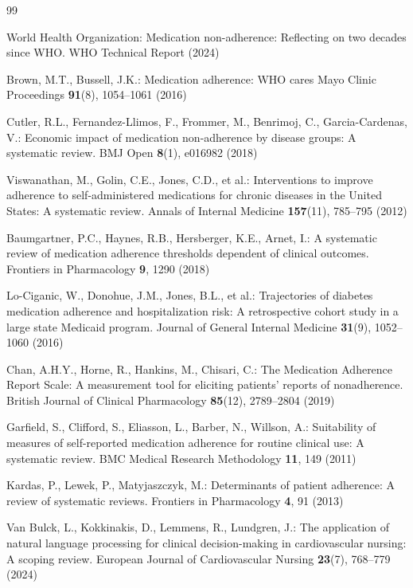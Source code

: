 \documentclass{article}
\begin{document}
\newpage

\begin{thebibliography}{99}

World Health Organization: Medication non-adherence: Reflecting on two decades since WHO. WHO Technical Report (2024)

Brown, M.T., Bussell, J.K.: Medication adherence: WHO cares  Mayo Clinic Proceedings \textbf{91}(8), 1054--1061 (2016)

Cutler, R.L., Fernandez-Llimos, F., Frommer, M., Benrimoj, C., Garcia-Cardenas, V.: Economic impact of medication non-adherence by disease groups: A systematic review. BMJ Open \textbf{8}(1), e016982 (2018)

Viswanathan, M., Golin, C.E., Jones, C.D., et al.: Interventions to improve adherence to self-administered medications for chronic diseases in the United States: A systematic review. Annals of Internal Medicine \textbf{157}(11), 785--795 (2012)

Baumgartner, P.C., Haynes, R.B., Hersberger, K.E., Arnet, I.: A systematic review of medication adherence thresholds dependent of clinical outcomes. Frontiers in Pharmacology \textbf{9}, 1290 (2018)

Lo-Ciganic, W., Donohue, J.M., Jones, B.L., et al.: Trajectories of diabetes medication adherence and hospitalization risk: A retrospective cohort study in a large state Medicaid program. Journal of General Internal Medicine \textbf{31}(9), 1052--1060 (2016)

Chan, A.H.Y., Horne, R., Hankins, M., Chisari, C.: The Medication Adherence Report Scale: A measurement tool for eliciting patients' reports of nonadherence. British Journal of Clinical Pharmacology \textbf{85}(12), 2789--2804 (2019)

Garfield, S., Clifford, S., Eliasson, L., Barber, N., Willson, A.: Suitability of measures of self-reported medication adherence for routine clinical use: A systematic review. BMC Medical Research Methodology \textbf{11}, 149 (2011)

Kardas, P., Lewek, P., Matyjaszczyk, M.: Determinants of patient adherence: A review of systematic reviews. Frontiers in Pharmacology \textbf{4}, 91 (2013)


Van Bulck, L., Kokkinakis, D., Lemmens, R., Lundgren, J.: The application of natural language processing for clinical decision-making in cardiovascular nursing: A scoping review. European Journal of Cardiovascular Nursing \textbf{23}(7), 768--779 (2024)


\end{thebibliography}
\end{document}
